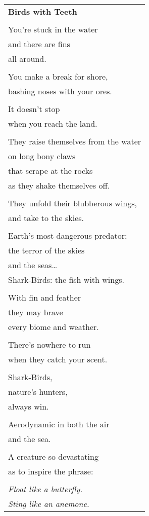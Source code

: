 \documentclass{article}
\begin{document}
\begin{center}
\begin{tabular}{l}
\textbf{Birds with Teeth} \\
\\
You're stuck in the water \\
and there are fins \\
all around. \\
\\
You make a break for shore, \\
bashing noses with your ores. \\
\\
It doesn't stop \\
when you reach the land. \\
\\
They raise themselves from the water \\
on long bony claws \\
that scrape at the rocks \\
as they shake themselves off. \\
\\
They unfold their blubberous wings, \\
and take to the skies. \\
\\
Earth's most dangerous predator; \\
the terror of the skies \\
and the seas\ldots \\
Shark-Birds: the fish with wings. \\
\\
With fin and feather \\
they may brave \\
every biome and weather. \\
\\
There's nowhere to run \\
when they catch your scent. \\
\\
Shark-Birds, \\
nature's hunters, \\
always win. \\
\\
Aerodynamic in both the air \\
and the sea. \\
\\
A creature so devastating \\
as to inspire the phrase: \\
\\
\textit{Float like a butterfly.} \\
\textit{Sting like an anemone.} \\
\end{tabular}
\end{center}
\end{document}
